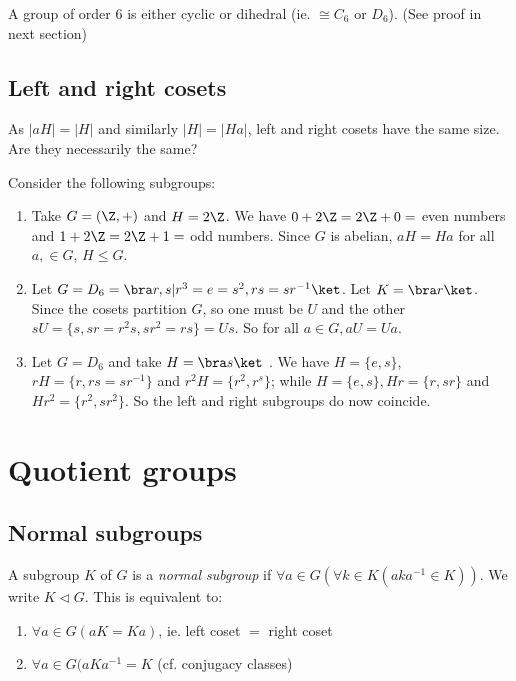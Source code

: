 \documentclass[a4paper]{article}
\begin{document}
  \begin{prop}
    A group of order $6$ is either cyclic or dihedral (ie. $\cong C_6$ or $D_6$). (See proof in next section)
  \end{prop}

  \subsection{Left and right cosets}
  As $|aH| = |H|$  and similarly $|H| = |Ha|$, left and right cosets have the same size. Are they necessarily the same?
  \begin{eg}
    Consider the following subgroups:
    \begin{enumerate}
      \item Take $G = (\Z, +)$ and $H = 2\Z$. We have $0 + 2\Z = 2\Z + 0 = $ even numbers and $1 + 2\Z = 2\Z + 1 = $ odd numbers. Since $G$ is abelian, $aH = Ha$ for all $a, \in G$, $H\leq G$.
      \item Let $G = D_6 = \bra r, s | r^3 = e = s^2, rs = sr^{-1}\ket$. Let $K = \bra r\ket$. Since the cosets partition $G$, so one must be $U$ and the other $sU = \{s, sr = r^2s, sr^2 = rs\} = Us$. So for all $a\in G, aU = Ua$. 
      \item Let $G = D_6$ and take $H = \bra s\ket$ . We have $H = \{e, s\}$, $rH = \{r, rs = sr^{-1}\}$ and $r^2 H = \{r^2, r^s\}$; while $H = \{e, s\}, Hr = \{r, sr\}$ and $Hr^2=\{r^2, sr^2\}$. So the left and right subgroups do now coincide.
    \end{enumerate}
  \end{eg}

  \section{Quotient groups}
  \subsection{Normal subgroups}
  \begin{defi}
    A subgroup $K$ of $G$ is a \emph{normal subgroup} if $\forall a\in G(\forall k\in K(aka^{-1}\in K))$. We write $K\lhd G$. This is equivalent to:
    \begin{enumerate}
      \item $\forall a\in G(aK = Ka)$, ie. left coset $=$ right coset
      \item $\forall a\in G(aKa^{-1} = K$ (cf. conjugacy classes)
    \end{enumerate}
  \end{defi}
\end{document}
